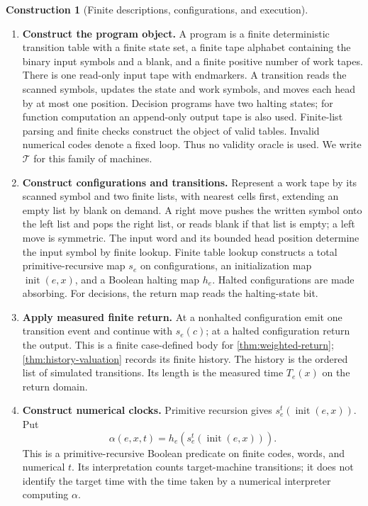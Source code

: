 \documentclass[11pt,a4paper]{article}
\numberwithin{algorithm}{section}
\numberwithin{equation}{section}
\theoremstyle{definition}
\theoremstyle{remark}
\theoremstyle{plain}
\theoremstyle{definition}
\newtheorem{construction}[construction]{Construction}
\theoremstyle{plain}
\begin{document}
\begin{construction}[Finite descriptions, configurations, and execution]
\label{constr:wc-tm}
\leavevmode
\begin{enumerate}[leftmargin=*,align=left]
\item \textbf{Construct the program object.}
A program is a finite deterministic transition table with a finite
state set, a finite tape alphabet containing the binary input symbols
and a blank, and a finite positive number of work tapes. There is one
read-only input tape with endmarkers. A transition reads the scanned
symbols, updates the state and work symbols, and moves each head by
at most one position. Decision programs have two halting states; for
function computation an append-only output tape is also used.
Finite-list parsing and finite checks construct the object of valid
tables. Invalid numerical codes denote a fixed loop. Thus no validity
oracle is used. We write $\mathcal T$ for this family of machines.
\item \textbf{Construct configurations and transitions.}
Represent a work tape by its scanned symbol and two finite lists, with
nearest cells first, extending an empty list by blank on demand. A
right move pushes the written symbol onto the left list and pops the
right list, or reads blank if that list is empty; a left move is
symmetric. The input word and its bounded head position determine the
input symbol by finite lookup. Finite table lookup constructs a total
primitive-recursive map $s_e$ on configurations, an initialization map
$\operatorname{init}(e,x)$, and a Boolean halting map $h_e$. Halted
configurations are made absorbing. For decisions, the return map reads
the halting-state bit.
\item \textbf{Apply measured finite return.}
At a nonhalted configuration emit one transition event and continue
with $s_e(c)$; at a halted configuration return the output. This is a
finite case-defined body for \cref{thm:weighted-return};
\cref{thm:history-valuation} records its finite history. The history is the ordered list of simulated transitions.
Its length is the measured time $T_e(x)$ on the return domain.
\item \textbf{Construct numerical clocks.}
Primitive recursion gives $s_e^t(\operatorname{init}(e,x))$. Put
\[
 \alpha(e,x,t)=h_e(s_e^t(\operatorname{init}(e,x))).
\]
This is a primitive-recursive Boolean predicate on finite codes, words,
and numerical $t$. Its interpretation counts target-machine transitions;
it does not identify the target time with the time taken by a numerical
interpreter computing $\alpha$.
\end{enumerate}
\end{construction}
\end{document}
